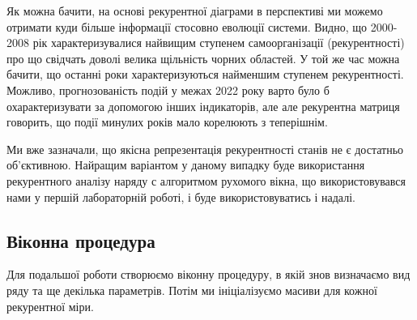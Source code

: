 \documentclass[
  letterpaper,
]{report}
\begin{document}
Як можна бачити, на основі рекурентної діаграми в перспективі ми можемо
отримати куди більше інформації стосовно еволюції системи. Видно, що
2000-2008 рік характеризувалися найвищим ступенем самоорганізації
(рекурентності) про що свідчать доволі велика щільність чорних областей.
У той же час можна бачити, що останні роки характеризуються найменшим
ступенем рекурентності. Можливо, прогнозованість подій у межах 2022 року
варто було б охарактеризувати за допомогою інших індикаторів, але але
рекурентна матриця говорить, що події минулих років мало корелюють з
теперішнім.

Ми вже зазначали, що якісна репрезентація рекурентності станів не є
достатньо об'єктивною. Найращим варіантом у даному випадку буде
використання рекурентного аналізу наряду с алгоритмом рухомого вікна, що
використовувався нами у першій лабораторній роботі, і буде
використовуватись і надалі.

\hypertarget{ux432ux456ux43aux43eux43dux43dux430-ux43fux440ux43eux446ux435ux434ux443ux440ux430}{%
\subsection{Віконна
процедура}\label{ux432ux456ux43aux43eux43dux43dux430-ux43fux440ux43eux446ux435ux434ux443ux440ux430}}

Для подальшої роботи створюємо віконну процедуру, в якій знов визначаємо
вид ряду та ще декілька параметрів. Потім ми ініціалізуємо масиви для
кожної рекурентної міри.
\end{document}
